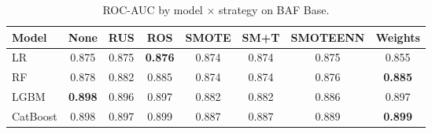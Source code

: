 \begin{table}[ht]
\centering
\caption{ROC-AUC by model $\times$ strategy on BAF Base.}
\label{tab:factorial_baf_rocauc}
\begin{tabular}{l c c c c c c c}
\toprule
Model & None & RUS & ROS & SMOTE & SM+T & SMOTEENN & Weights \\
\midrule
LR         & 0.875 & 0.875 & \textbf{0.876} & 0.874 & 0.874 & 0.875 & 0.855 \\
RF         & 0.878 & 0.882 & 0.885 & 0.874 & 0.874 & 0.876 & \textbf{0.885} \\
LGBM       & \textbf{0.898} & 0.896 & 0.897 & 0.882 & 0.882 & 0.886 & 0.897 \\
CatBoost   & 0.898 & 0.897 & 0.899 & 0.887 & 0.887 & 0.889 & \textbf{0.899} \\
\bottomrule
\end{tabular}
\end{table}